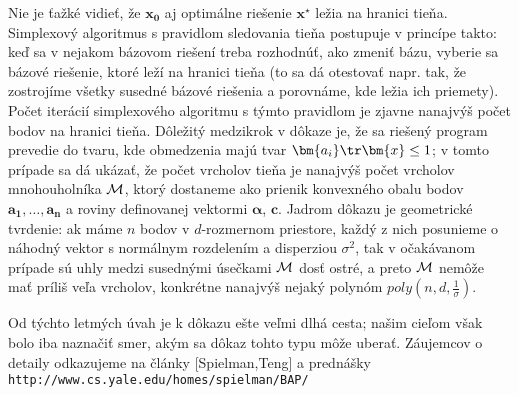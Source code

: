 \noindent
Nie je ťažké vidieť, že $\bm{x_0}$ aj optimálne riešenie $\bm{x^\star}$ ležia na hranici tieňa. 
Simplexový algoritmus s pravidlom sledovania tieňa postupuje v princípe takto: 
keď sa v nejakom bázovom riešení treba rozhodnúť, ako zmeniť bázu, 
vyberie sa bázové riešenie, ktoré leží na hranici tieňa
(to sa dá otestovať napr. tak, že zostrojíme všetky susedné bázové riešenia a porovnáme, kde ležia ich priemety).
Počet iterácií simplexového algoritmu s týmto pravidlom je zjavne nanajvýš počet bodov na hranici tieňa. 
Dôležitý medzikrok v dôkaze je, že sa riešený program prevedie do tvaru, kde 
obmedzenia majú tvar $\bm{a_i}\tr\bm{x}\le1$; v tomto
prípade sa dá ukázať, že počet vrcholov tieňa je nanajvýš počet vrcholov mnohouholníka $\cal M$,
ktorý dostaneme ako prienik konvexného obalu bodov 
$\bm{a_1},\ldots,\bm{a_n}$ a roviny definovanej vektormi $\bm{\alpha}$, $\bm{c}$.
Jadrom dôkazu je geometrické tvrdenie: ak máme $n$ bodov v $d$-rozmernom priestore, každý z nich posunieme
o náhodný vektor s normálnym rozdelením a disperziou $\sigma^2$, tak v očakávanom prípade sú uhly medzi susednými
úsečkami $\cal M$ dosť ostré, a preto $\cal M$ nemôže mať príliš veľa vrcholov, konkrétne nanajvýš nejaký polynóm
$poly(n,d,\frac{1}{\sigma})$.

\noindent
Od týchto letmých úvah je k dôkazu ešte veľmi dlhá cesta; našim cieľom však bolo iba naznačiť smer, akým sa
dôkaz tohto typu môže uberať. Záujemcov o detaily odkazujeme na články [Spielman,Teng] a prednášky
{\tt http://www.cs.yale.edu/homes/spielman/BAP/}
